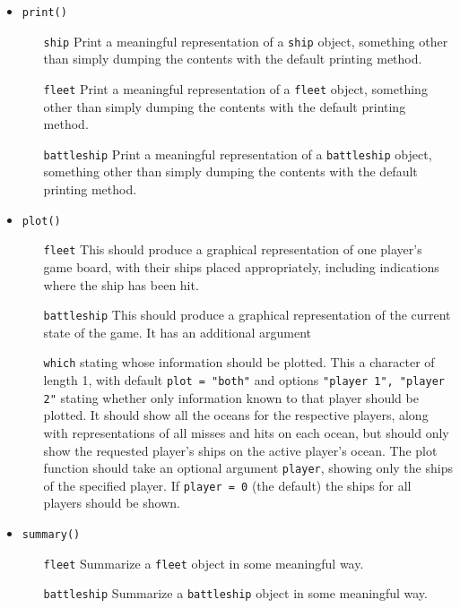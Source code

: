 \documentclass[
]{article}
\begin{document}
\begin{itemize}
\item{\texttt{print()}}
  \begin{itemize}
    \item[\texttt{ship}] Print a meaningful representation of a \texttt{ship} object, something other than simply dumping the contents with the default printing method.
    \item[\texttt{fleet}] Print a meaningful representation of a \texttt{fleet} object, something other than simply dumping the contents with the default printing method.
    \item[\texttt{battleship}]Print a meaningful representation of a \texttt{battleship} object, something other than simply dumping the contents with the default printing method.
  \end{itemize}

\item{\texttt{plot()}}
  \begin{itemize}
    \item[\texttt{fleet}] This should produce a graphical representation of one player's game board, with their ships placed appropriately, including indications where the ship has been hit.
    \item[\texttt{battleship}] This should produce a graphical representation of the current state of the game. It has an additional argument \item[\texttt{which}] stating whose information should be plotted. This a character of length 1, with default \texttt{plot = "both"} and options \texttt{"player 1", "player 2"} stating whether only information known to that player should be plotted.
    It should show all the oceans for the respective players, along with representations of all misses and hits on each ocean, but should only show the requested player's ships on the active player's ocean.
    The plot function should take an optional argument \texttt{player}, showing only the ships of the specified player. If \texttt{player = 0} (the default) the ships for all players should be shown.
  \end{itemize}

\item{\texttt{summary()}}
  \begin{itemize}
    \item[\texttt{fleet}] Summarize a \texttt{fleet} object in some meaningful way.
    \item[\texttt{battleship}] Summarize a \texttt{battleship} object in some meaningful way.
  \end{itemize}
\end{itemize}
\end{document}
